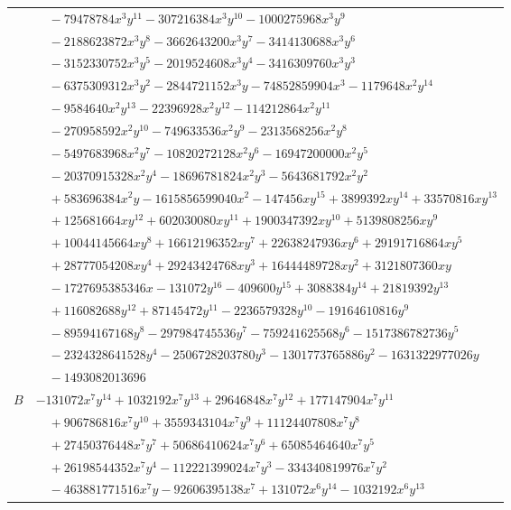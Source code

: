 \documentclass[11pt]{article}
\begin{document}
\begin{longtable}{@{}ll@{}}
 & $\quad -79478784x^{3}y^{11}-307216384x^{3}y^{10}-1000275968x^{3}y^{9}$\\
 & $\quad -2188623872x^{3}y^{8}-3662643200x^{3}y^{7}-3414130688x^{3}y^{6}$\\
 & $\quad -3152330752x^{3}y^{5}-2019524608x^{3}y^{4}-3416309760x^{3}y^{3}$\\
 & $\quad -6375309312x^{3}y^{2}-2844721152x^{3}y-74852859904x^{3}-1179648x^{2}y^{14}$\\
 & $\quad -9584640x^{2}y^{13}-22396928x^{2}y^{12}-114212864x^{2}y^{11}$\\
 & $\quad -270958592x^{2}y^{10}-749633536x^{2}y^{9}-2313568256x^{2}y^{8}$\\
 & $\quad -5497683968x^{2}y^{7}-10820272128x^{2}y^{6}-16947200000x^{2}y^{5}$\\
 & $\quad -20370915328x^{2}y^{4}-18696781824x^{2}y^{3}-5643681792x^{2}y^{2}$\\
 & $\quad +583696384x^{2}y-1615856599040x^{2}-147456xy^{15}+3899392xy^{14}+33570816xy^{13}$\\
 & $\quad +125681664xy^{12}+602030080xy^{11}+1900347392xy^{10}+5139808256xy^{9}$\\
 & $\quad +10044145664xy^{8}+16612196352xy^{7}+22638247936xy^{6}+29191716864xy^{5}$\\
 & $\quad +28777054208xy^{4}+29243424768xy^{3}+16444489728xy^{2}+3121807360xy$\\
 & $\quad -1727695385346x-131072y^{16}-409600y^{15}+3088384y^{14}+21819392y^{13}$\\
 & $\quad +116082688y^{12}+87145472y^{11}-2236579328y^{10}-19164610816y^{9}$\\
 & $\quad -89594167168y^{8}-297984745536y^{7}-759241625568y^{6}-1517386782736y^{5}$\\
 & $\quad -2324328641528y^{4}-2506728203780y^{3}-1301773765886y^{2}-1631322977026y$\\
 & $\quad -1493082013696$\\
$B$ & $-131072x^{7}y^{14}+1032192x^{7}y^{13}+29646848x^{7}y^{12}+177147904x^{7}y^{11}$\\
 & $\quad +906786816x^{7}y^{10}+3559343104x^{7}y^{9}+11124407808x^{7}y^{8}$\\
 & $\quad +27450376448x^{7}y^{7}+50686410624x^{7}y^{6}+65085464640x^{7}y^{5}$\\
 & $\quad +26198544352x^{7}y^{4}-112221399024x^{7}y^{3}-334340819976x^{7}y^{2}$\\
 & $\quad -463881771516x^{7}y-92606395138x^{7}+131072x^{6}y^{14}-1032192x^{6}y^{13}$\\

\end{longtable}
\end{document}
